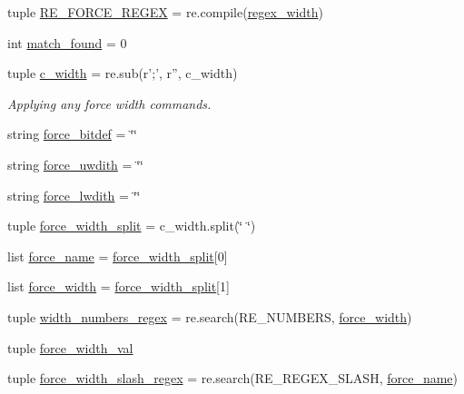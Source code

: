 \begin{DoxyCompactItemize}
tuple \hyperlink{namespaceveripy_a92e4c231594631dc5b0b3fa84f28c05d}{R\-E\-\_\-\-F\-O\-R\-C\-E\-\_\-\-R\-E\-G\-E\-X} = re.\-compile(\hyperlink{namespaceveripy_a5e677540fde9f9052f3c7c5a7d12243c}{regex\-\_\-width})
\item 
int \hyperlink{namespaceveripy_a36080b835363b2f49375da1d2031699d}{match\-\_\-found} = 0
\item 
tuple \hyperlink{namespaceveripy_a7abce416f31880ab21237252118fad96}{c\-\_\-width} = re.\-sub(r';', r'', c\-\_\-width)
\begin{DoxyCompactList}\small\item\em Applying any force width commands. \end{DoxyCompactList}\item 
string \hyperlink{namespaceveripy_a9822bb2309876404c811435995f2d238}{force\-\_\-bitdef} = \char`\"{}\char`\"{}
\item 
string \hyperlink{namespaceveripy_abb92d8c13117ba4c4421ceb0de1dc6b8}{force\-\_\-uwdith} = \char`\"{}\char`\"{}
\item 
string \hyperlink{namespaceveripy_af4d2239bb757aeee622c2066f0d4b766}{force\-\_\-lwdith} = \char`\"{}\char`\"{}
\item 
tuple \hyperlink{namespaceveripy_a13b3bfca586edc9ccb7a76161973958d}{force\-\_\-width\-\_\-split} = c\-\_\-width.\-split(\char`\"{} \char`\"{})
\item 
list \hyperlink{namespaceveripy_a562ab1159e6bb9e14c42054833922dba}{force\-\_\-name} = \hyperlink{namespaceveripy_a13b3bfca586edc9ccb7a76161973958d}{force\-\_\-width\-\_\-split}\mbox{[}0\mbox{]}
\item 
list \hyperlink{namespaceveripy_a16214fafff2c0c57bf66e31585f5d744}{force\-\_\-width} = \hyperlink{namespaceveripy_a13b3bfca586edc9ccb7a76161973958d}{force\-\_\-width\-\_\-split}\mbox{[}1\mbox{]}
\item 
tuple \hyperlink{namespaceveripy_af5cff4136cdf82435499ac37785ac957}{width\-\_\-numbers\-\_\-regex} = re.\-search(R\-E\-\_\-\-N\-U\-M\-B\-E\-R\-S, \hyperlink{namespaceveripy_a16214fafff2c0c57bf66e31585f5d744}{force\-\_\-width})
\item 
tuple \hyperlink{namespaceveripy_a60a97a619c71da8223604f1b12408d8f}{force\-\_\-width\-\_\-val}
\item 
tuple \hyperlink{namespaceveripy_a030728d416c89f9e49833da5a3a36e8f}{force\-\_\-width\-\_\-slash\-\_\-regex} = re.\-search(R\-E\-\_\-\-R\-E\-G\-E\-X\-\_\-\-S\-L\-A\-S\-H, \hyperlink{namespaceveripy_a562ab1159e6bb9e14c42054833922dba}{force\-\_\-name})
\item 

\end{DoxyCompactItemize}
